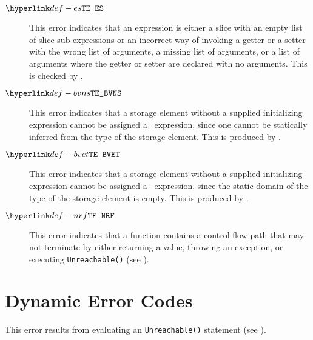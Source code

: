 \begin{description}
\hypertarget{def-es}{}
\item[$\EmptySlice$]
This error indicates that an expression is either a slice with an empty list of slice sub-expressions
or an incorrect way of invoking a getter or a setter with the wrong list of arguments, a missing
list of arguments, or a list of arguments where the getter or setter are declared with no arguments.
This is checked by .

\hypertarget{def-bvns}{}
\item[$\BaseValueNonStatic$]
This error indicates that a storage element without a supplied initializing expression cannot be
assigned a \basevalueterm\ expression, since one cannot be statically inferred from the type of the
storage element.
This is produced by .

\hypertarget{def-bvet}{}
\item[$\BaseValueEmptyType$]
This error indicates that a storage element without a supplied initializing expression cannot be
assigned a \basevalueterm\ expression, since the static domain of the type of the storage element
is empty.
This is produced by .

\hypertarget{def-nrf}{}
\item[$\NonReturningFunction$]
This error indicates that a function contains a control-flow path that may not terminate by
either returning a value, throwing an exception, or executing \texttt{Unreachable()}
(see ).

\end{description}

\section{Dynamic Error Codes}
\begin{description}
\hypertarget{def-unr}{}
\item[$\UnreachableError$]
This error results from evaluating an \texttt{Unreachable()} statement (see ).
\end{description}
